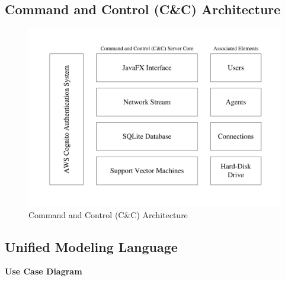 \subsection{Command and Control (C\&C) Architecture}

\begin{figure}[h]
    \centering
    \includegraphics[width=1.0\textwidth]{images/command-and-control-architecture.pdf}
    \captionsetup{justification=centering}
    \caption[Command and Control (C\&C) Architecture]{Command and Control (C\&C) Architecture}
    \label{fig:command-control-architecture}
\end{figure}

\newpage

\subsection{Unified Modeling Language}

\noindent
\textbf{Use Case Diagram}

